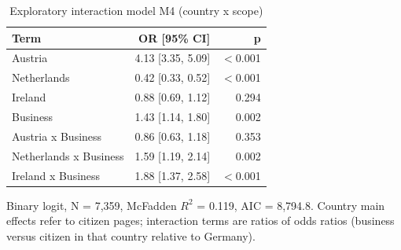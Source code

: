 \begin{table}[htbp]
\centering
\begin{threeparttable}
\caption{Exploratory interaction model M4 (country x scope)}
\label{tab:regression-m4}
\begin{tabular}{lrr}
\hline
Term & OR [95\% CI] & p \\
\hline
Austria & 4.13 [3.35, 5.09] & $<$0.001 \\
Netherlands & 0.42 [0.33, 0.52] & $<$0.001 \\
Ireland & 0.88 [0.69, 1.12] & 0.294 \\
Business & 1.43 [1.14, 1.80] & 0.002 \\
Austria x Business & 0.86 [0.63, 1.18] & 0.353 \\
Netherlands x Business & 1.59 [1.19, 2.14] & 0.002 \\
Ireland x Business & 1.88 [1.37, 2.58] & $<$0.001 \\
\hline
\end{tabular}
\begin{tablenotes}
\footnotesize
\item Binary logit, N = 7,359, McFadden $R^2$ = 0.119, AIC = 8,794.8. Country main effects refer to citizen pages; interaction terms are ratios of odds ratios (business versus citizen in that country relative to Germany).
\end{tablenotes}
\end{threeparttable}
\end{table}
